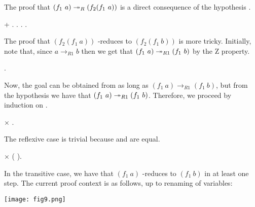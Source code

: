 The proof that $(f_1\ a)
    \twoheadrightarrow_R (f_2 (f_1\ a))$ is a direct consequence of the hypothesis
    . \begin{coqdoccode}
\coqdocemptyline
\coqdocindent{2.00em}
+    .  .   .  . \end{coqdoccode}
The
    proof that $(f_2 (f_1\ a))$ -reduces to $(f_2 (f_1\ b))$ is
    more tricky. Initially, note that, since $a \to_{R1} b$ then we
    get that $(f_1\ a) \tto_{R1} (f_1\ b)$ by the Z property. \begin{coqdoccode}
\coqdocemptyline
\coqdocindent{3.00em}
 . \end{coqdoccode}
Now, the goal can be obtained from  as
      long as $(f_1\ a) \to_{R1} (f_1\ b)$, but from the hypothesis
       we have that $(f_1\ a) \tto_{R1} (f_1\ b)$. Therefore, we
      proceed by induction on . \begin{coqdoccode}
\coqdocemptyline
\coqdocindent{3.00em}
\ensuremath{\times}  . \end{coqdoccode}
The reflexive case is trivial because  and
         are equal. \begin{coqdoccode}
\coqdocemptyline
\coqdocindent{3.00em}
\ensuremath{\times}    ( ). \end{coqdoccode}
In the
        transitive case, we have that $(f_1\ a)$ -reduces to
        $(f_1\ b)$ in at least one step. The current proof context is
        as follows, up to renaming of variables:


      \texttt{[image: fig9.png]}



